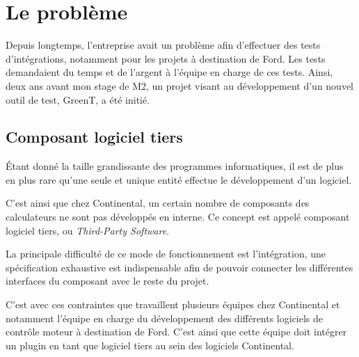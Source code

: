 \chapter{Le problème} \label{chapPb}
\putminitoc
Depuis longtemps, l'entreprise avait un problème afin d'effectuer des tests d'intégrations, notamment pour les projets à destination de Ford. Les tests demandaient du temps et de l'argent à l'équipe en charge de ces tests. Ainsi, deux ans avant mon stage de M2, un projet visant au développement d'un nouvel outil de test, GreenT, a été initié.
	\section{Composant logiciel tiers}
	Étant donné la taille grandissante des programmes informatiques, il est de plus en plus rare qu'une seule et unique entité effectue le développement d'un logiciel.
	
	C'est ainsi que chez Continental, un certain nombre de composants des calculateurs ne sont pas développés en interne. Ce concept est appelé composant logiciel tiers, ou \textit{Third-Party Software}. 
	
	La principale difficulté de ce mode de fonctionnement est l'intégration, une spécification exhaustive est indispensable afin de pouvoir connecter les différentes interfaces du composant avec le reste du projet. 
	
	C'est avec ces contraintes que travaillent plusieurs équipes chez Continental et notamment l'équipe en charge du développement des différents logiciels de contrôle moteur à destination de Ford. C'est ainsi que cette équipe doit intégrer un plugin en tant que logiciel tiers au sein des logiciels Continental.
	
